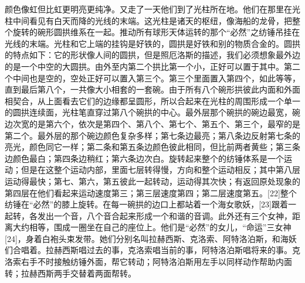 \documentclass[12pt,oneside]{book}
\begin{document}
颜色像虹但比虹更明亮更纯净。又走了一天他们到了光柱所在地。他们在那里在光柱中间看见有白天而降的光线的末端。这光柱是诸天的枢纽，像海船的龙骨，把整个旋转的碗形圆拱维系在一起。推动所有球形天体运转的那个“必然”之纺锤吊挂在光线的末端。光柱和它上端的挂钩是好铁的，圆拱是好铁和别的物质合金的。圆拱的特点如下：它的形状像人间的圆拱，但是照厄洛斯的描述，我们必须想象最外边的是一个中空的大圆拱。由外至内第二个拱比第一个小，正好可以置于其中。第二个中间也是空的，空处正好可以置入第三个。第三个里面置入第四个，如此等等，直到最后第八个，一共像大小相套的一套碗。由于所有八个碗形拱彼此内面和外面相契合，从上面看去它们的边缘都呈圆形，所以合起来在光柱的周围形成一个单一的圆拱连续面，光柱笔直穿过第八个碗拱的中心。最外层那个碗拱的碗边最宽，碗边次宽的是第六个，依次是第四个、第八个、第七个、第五个、第三个，最窄的是第二个。最外层的那个碗边颜色复杂多样；第七条边最亮；第八条边反射第七条的亮光，颜色同它一样；第二条和第五条边颜色彼此相同，但比前两者黄些；第三条边颜色最白；第四条边稍红；第六条边次白。旋转起来整个的纺锤体系是一个运动；但是在这整个运动内部，里面七层转得慢，方向和整个运动相反；其中第八层运动得最快；第七、第六，第五彼此一起转动，运动得其次快；有返回原处现象的第四层在他们看起来运动速度第三；第三层速度第四；第二层速度第五。[22]整个纺锤在“必然”的膝上旋转。在每一碗拱的边口上都站着一个海女歌妖，[23]跟着一起转，各发出一个音，八个音合起来形成一个和谐的音调。此外还有三个女神，距离大约相等，围成一圈坐在自己的座位上。他们是“必然”的女儿，“命运”三女神[24]，身着白袍头束发带。她们分别名叫拉赫西斯、克洛索、阿特洛泊斯，和海妖们合唱着。拉赫西斯唱过去的事，克洛索唱当前的事，阿特洛泊斯唱将来的事。克洛索右手不时接触纺锤外面，帮它转动；阿特洛泊斯用左手以同样动作帮助内面转；拉赫西斯两手交替着两面帮转。
\end{document}

